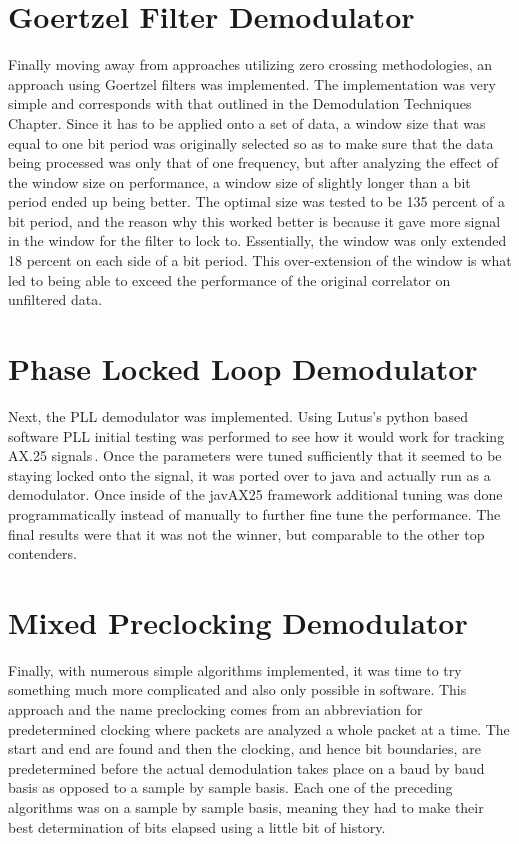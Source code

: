 \section{Goertzel Filter Demodulator}
Finally moving away from approaches utilizing zero crossing methodologies, an approach using Goertzel filters was implemented. The implementation was very simple and corresponds with that outlined in the Demodulation Techniques Chapter. Since it has to be applied onto a set of data, a window size that was equal to one bit period was originally selected so as to make sure that the data being processed was only that of one frequency, but after analyzing the effect of the window size on performance, a window size of slightly longer than a bit period ended up being better. The optimal size was tested to be 135 percent of a bit period, and the reason why this worked better is because it gave more signal in the window for the filter to lock to. Essentially, the window was only extended 18 percent on each side of a bit period. This over-extension of the window is what led to being able to exceed the performance of the original correlator on unfiltered data.

\section{Phase Locked Loop Demodulator}
Next, the PLL demodulator was implemented. Using Lutus's python based software PLL initial testing was performed to see how it would work for tracking AX.25 signals\,\cite{Lutus2011}. Once the parameters were tuned sufficiently that it seemed to be staying locked onto the signal, it was ported over to java and actually run as a demodulator. Once inside of the javAX25 framework additional tuning was done programmatically instead of manually to further fine tune the performance. The final results were that it was not the winner, but comparable to the other top contenders.

\section{Mixed Preclocking Demodulator}
Finally, with numerous simple algorithms implemented, it was time to try something much more complicated and also only possible in software. This approach and the name preclocking comes from an abbreviation for predetermined clocking where packets are analyzed a whole packet at a time. The start and end are found and then the clocking, and hence bit boundaries, are predetermined before the actual demodulation takes place on a baud by baud basis as opposed to a sample by sample basis. Each one of the preceding algorithms was on a sample by sample basis, meaning they had to make their best determination of bits elapsed using a little bit of history.

